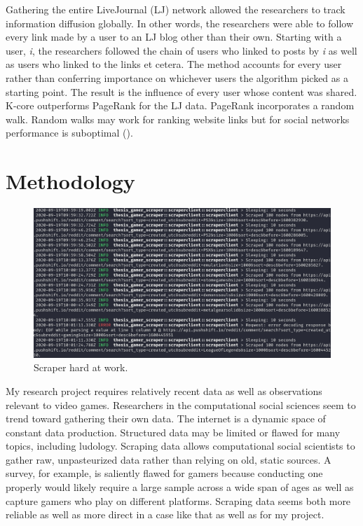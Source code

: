 \documentclass[12pt, a4paper]{article}
\begin{document}
Gathering the entire LiveJournal (LJ) network allowed the researchers to track information diffusion globally. In other words, the researchers were able to follow every link made by a user to an LJ blog other than their own. Starting with a user, \textit{i}, the researchers followed the chain of users who linked to posts by \textit{i} as well as users who linked to the links et cetera. The method accounts for every user rather than conferring importance on whichever users the algorithm picked as a starting point. The result is the influence of every user whose content was shared. K-core outperforms PageRank for the LJ data. PageRank incorporates a random walk. Random walks may work for ranking website links but for social networks performance is suboptimal (\cite{peispread2014}).

\section{Methodology}

\begin{figure}[ht!]
  \includegraphics[width=\linewidth]{scraper_at_work.png}
  \caption{Scraper hard at work.}
  \label{fig:workingscraper}
\end{figure}

My research project requires relatively recent data as well as observations relevant to video games. Researchers in the computational social sciences seem to trend toward gathering their own data. The internet is a dynamic space of constant data production. Structured data may be limited or flawed for many topics, including ludology. Scraping data allows computational social scientists to gather raw, unpasteurized data rather than relying on old, static sources. A survey, for example, is saliently flawed for gamers because conducting one properly would likely require a large sample across a wide span of ages as well as capture gamers who play on different platforms. Scraping data seems both more reliable as well as more direct in a case like that as well as for my project.
\end{document}
